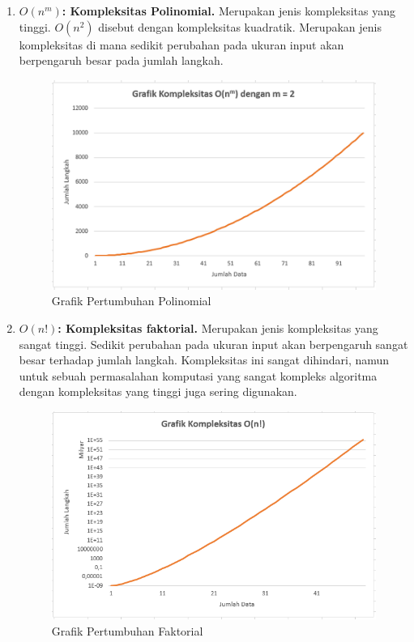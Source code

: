 \begin{enumerate}
    \FloatBarrier

    \item \textbf{$O (n^m)$: Kompleksitas Polinomial.} Merupakan jenis kompleksitas yang tinggi. $O (n^2)$ disebut dengan kompleksitas kuadratik. Merupakan jenis kompleksitas di mana sedikit perubahan pada ukuran input akan berpengaruh besar pada jumlah langkah.

    \begin{figure}
        \centering
        \includegraphics[width=\textwidth]{fig/ExponentialGrowth}
        \caption{Grafik Pertumbuhan Polinomial}
    \end{figure}

    \FloatBarrier

    \item \textbf{$O (n!)$: Kompleksitas faktorial.} Merupakan jenis kompleksitas yang sangat tinggi. Sedikit perubahan pada ukuran input akan berpengaruh sangat besar terhadap jumlah langkah. Kompleksitas ini sangat dihindari, namun untuk sebuah permasalahan komputasi yang sangat kompleks algoritma dengan kompleksitas yang tinggi juga sering digunakan.

    \begin{figure}
        \centering
        \includegraphics[width=\textwidth]{fig/FactorialGrowth}
        \caption{Grafik Pertumbuhan Faktorial}
    \end{figure}

    \FloatBarrier
\end{enumerate}

